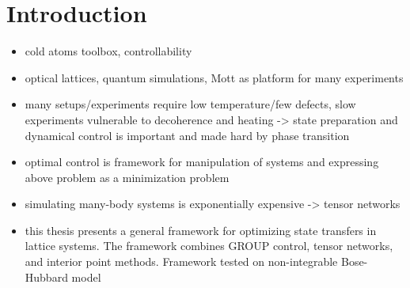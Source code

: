\chapter{Introduction}

\begin{itemize}
\item
cold atoms toolbox, controllability 

\item
optical lattices, quantum simulations, Mott as platform for many experiments

\item
many setups/experiments require low temperature/few defects, slow experiments vulnerable to decoherence and heating -> state preparation and dynamical control is important and made hard by phase transition

\item
optimal control is framework for manipulation of systems and expressing above problem as a minimization problem

\item 
simulating many-body systems is exponentially expensive -> tensor networks 

\item
this thesis presents a general framework for optimizing state transfers in lattice systems. The framework combines GROUP control, tensor networks, and interior point methods. Framework tested on non-integrable Bose-Hubbard model
\end{itemize}

